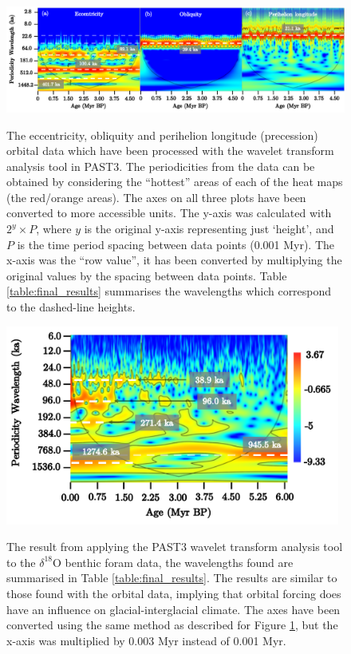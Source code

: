 \documentclass[12pt, onecolumn]{revtex4}    %
\begin{document}
\begin{figure}[!h]
\begin{center}
\includegraphics[width=16.2cm]{figures/wa_orbital_data}
\caption[]{The eccentricity, obliquity and perihelion longitude (precession) orbital data which have been processed with the wavelet transform analysis tool in PAST3. The periodicities from the data can be obtained by considering the ``hottest'' areas of each of the heat maps (the red/orange areas). The axes on all three plots have been converted to more accessible units. The y-axis was calculated with $2^y \times P$, where $y$ is the original y-axis representing just `height', and $P$ is the time period spacing between data points (0.001 Myr). The x-axis was the ``row value'', it has been converted by multiplying the original values by the spacing between data points. Table \ref{table:final_results} summarises the wavelengths which correspond to the dashed-line heights.}
\vspace{-3ex}
\label{fig:wa_orbital_data}
\end{center}
\end{figure}

\begin{figure}[!h]
\begin{center}
\includegraphics[width=11cm]{figures/wa_d18O.pdf}
\caption[]{The result from applying the PAST3 wavelet transform analysis tool to the $\delta^{18}$O benthic foram data, the wavelengths found are summarised in Table \ref{table:final_results}. The results are similar to those found with the orbital data, implying that orbital forcing does have an influence on glacial-interglacial climate. The axes have been converted using the same method as described for Figure \ref{fig:wa_orbital_data}, but the x-axis was multiplied by 0.003 Myr instead of 0.001 Myr. }
\vspace{-3ex}
\label{fig:wa_d18o}
\end{center}
\end{figure}
\end{document}
